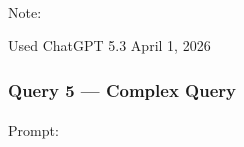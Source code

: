 \documentclass[
  letterpaper,
  DIV=11,
  numbers=noendperiod]{scrartcl}
\makeatletter
\let\oldparagraph\paragraph
\renewcommand{\paragraph}{
    \@ifstar
      \xxxParagraphStar
      \xxxParagraphNoStar
  }
\newcommand{\xxxParagraphStar}[1]{\oldparagraph*{#1}\mbox{}}
\newcommand{\xxxParagraphNoStar}[1]{\oldparagraph{#1}\mbox{}}
\makeatother
\begin{document}
\paragraph{Note:}\label{note-3}

Used ChatGPT 5.3 April 1, 2026

\subsubsection{\texorpdfstring{\textbf{Query 5 ---} Complex
Query}{Query 5 --- Complex Query}}\label{query-5-complex-query}

\paragraph{Prompt:}\label{prompt-4}
\end{document}
